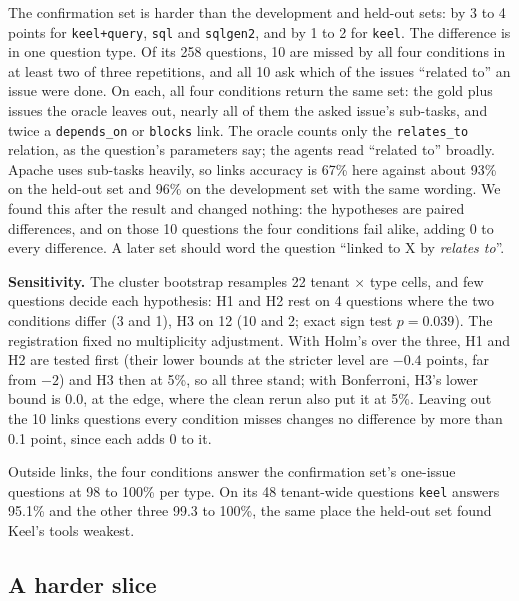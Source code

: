 \documentclass[sigconf, nonacm]{acmart}
\newcommand{\code}[1]{\texttt{#1}}
\begin{document}
The confirmation set is harder than the development and held-out sets: by 3 to 4 points for \code{keel+query}, \code{sql} and \code{sqlgen2}, and by 1 to 2 for \code{keel}. The difference is in one question type. Of its 258 questions, 10 are missed by all four conditions in at least two of three repetitions, and all 10 ask which of the issues ``related to'' an issue were done. On each, all four conditions return the same set: the gold plus issues the oracle leaves out, nearly all of them the asked issue's sub-tasks, and twice a \code{depends\_on} or \code{blocks} link. The oracle counts only the \code{relates\_to} relation, as the question's parameters say; the agents read ``related to'' broadly. Apache uses sub-tasks heavily, so links accuracy is 67\% here against about 93\% on the held-out set and 96\% on the development set with the same wording. We found this after the result and changed nothing: the hypotheses are paired differences, and on those 10 questions the four conditions fail alike, adding 0 to every difference. A later set should word the question ``linked to X by \emph{relates to}''.

\textbf{Sensitivity.} The cluster bootstrap resamples 22 tenant $\times$ type cells, and few questions decide each hypothesis: H1 and H2 rest on 4 questions where the two conditions differ (3 and 1), H3 on 12 (10 and 2; exact sign test $p = 0.039$). The registration fixed no multiplicity adjustment. With Holm's over the three, H1 and H2 are tested first (their lower bounds at the stricter level are $-0.4$ points, far from $-2$) and H3 then at 5\%, so all three stand; with Bonferroni, H3's lower bound is $0.0$, at the edge, where the clean rerun also put it at 5\%. Leaving out the 10 links questions every condition misses changes no difference by more than 0.1 point, since each adds 0 to it.

Outside links, the four conditions answer the confirmation set's one-issue questions at 98 to 100\% per type. On its 48 tenant-wide questions \code{keel} answers 95.1\% and the other three 99.3 to 100\%, the same place the held-out set found Keel's tools weakest.

\subsection{A harder slice}
\label{sec:hard}
\end{document}
